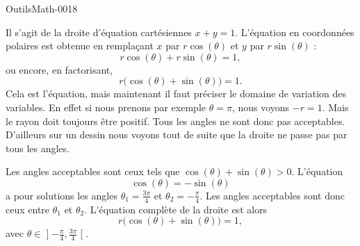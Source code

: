 
\begin{corrige}{OutilsMath-0018}

	Il s'agit de la droite d'équation cartésiennes $x+y=1$. L'équation en coordonnées polaires est obtenue en remplaçant $x$ par $r\cos(\theta)$ et $y$ par $r\sin(\theta)$ :
	\begin{equation}
		r\cos(\theta)+r\sin(\theta)=1,
	\end{equation}
	ou encore, en factorisant, 
	\begin{equation}
		r\big( \cos(\theta)+\sin(\theta) \big)=1.
	\end{equation}
	Cela est l'équation, mais maintenant il faut préciser le domaine de variation des variables. En effet si nous prenons par exemple $\theta=\pi$, nous voyons $-r=1$. Mais le rayon doit toujours être positif. Tous les angles ne sont donc pas acceptables. D'ailleurs sur un dessin nous voyons tout de suite que la droite ne passe pas par tous les angles.

	Les angles acceptables sont ceux tels que $\cos(\theta)+\sin(\theta)> 0$. L'équation
	\begin{equation}
		\cos(\theta)=-\sin(\theta)
	\end{equation}
	a pour solutions les angles $\theta_1=\frac{ 3\pi }{ 4 }$ et $\theta_2=-\frac{ \pi }{ 4 }$. Les angles acceptables sont donc ceux entre $\theta_1$ et $\theta_2$. L'équation complète de la droite est alors
	\begin{equation}
		r\big( \cos(\theta)+\sin(\theta) \big)=1,
	\end{equation}
	avec $\theta\in\mathopen] -\frac{ \pi }{ 4 } , \frac{ 3\pi }{ 4 } \mathclose[$.

\end{corrige}
